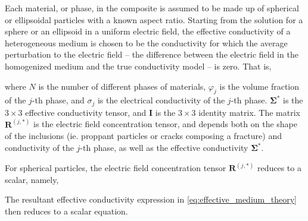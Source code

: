 Each material, or phase, in the composite is assumed to be made up of spherical or ellipsoidal particles with a known aspect ratio. Starting from the solution for a sphere or an ellipsoid in a uniform electric field, the effective conductivity of a heterogeneous medium is chosen to be the conductivity for which the average perturbation to the electric field -- the difference between the electric field in the homogenized medium and the true conductivity model -- is zero. That is,

where $N$ is the number of different phases of materials, $\varphi_j$ is the volume fraction of the $j$-th phase, and $\sigma_j$ is the electrical conductivity of the $j$-th phase. $\boldsymbol{\Sigma^*}$ is the $3 \times 3$ effective conductivity tensor, and $\mathbf{I}$ is the $3 \times 3$ identity matrix. The matrix $\mathbf{R}^{(j,*)}$ is the electric field concentration tensor, and depends both on the shape of the inclusions (ie. proppant particles or cracks composing a fracture) and conductivity of the $j$-th phase, as well as the effective conductivity $\boldsymbol{\Sigma^*}$.

For spherical particles, the electric field concentration tensor $\mathbf{R}^{(j,*)}$ reduces to a scalar, namely,

The resultant effective conductivity expression in \ref{eq:effective_medium_theory} then reduces to a scalar equation.

